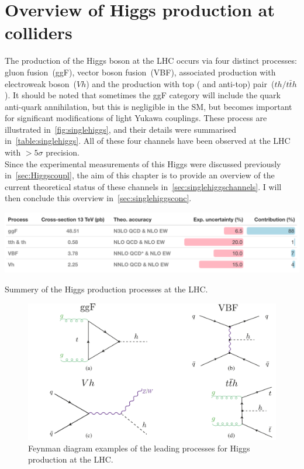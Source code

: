 \chapter{ Overview of Higgs production at colliders }\label{chap:overviewSingleHiggs}
The production of the Higgs boson at the LHC occurs via four distinct processes: gluon fusion~(ggF), vector boson fusion~(VBF), associated production with electroweak boson~($Vh$) and the production with top ( and anti-top) pair~($th / t \bar th$). It should be noted that sometimes the ggF category will include the quark anti-quark annihilation, but this is negligible in the SM, but becomes important for significant modifications of light Yukawa couplings. These process are illustrated in~\autoref{fig:singlehiggs}, and their details were summarised in~\autoref{table:singlehiggs}. All of these four channels have been observed at the LHC with $>5 \sigma$ precision. \\ 
Since the experimental measurements of this Higgs were discussed previously in~\autoref{sec:Higgscoupl}, the aim of this chapter is to provide an overview of the current theoretical status of these channels in~\autoref{sec:singlehiggschannels}. I will then conclude this overview in~\autoref{sec:singlehiggsconc}. 
\begin{table}[htbp!]
	\includegraphics[width=1\textwidth]{single_higgs_table}
	\caption{ Summery  of the Higgs production processes at the LHC. \label{table:singlehiggs} }
\end{table}
\begin{figure}[htbp!]
	\begin{center}
		\includegraphics[width=.75\textwidth]{figures/single_higgs}
		\caption{Feynman diagram examples of the leading processes for Higgs production at the LHC. \label{fig:singlehiggs} }
	\end{center}
\end{figure}
